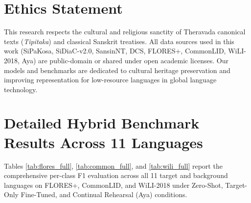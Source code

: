\documentclass[11pt]{article}
\begin{document}
\section*{Ethics Statement}
This research respects the cultural and religious sanctity of Theravada canonical texts (\textit{Tipitaka}) and classical Sanskrit treatises. All data sources used in this work (SiPaKosa, SiDiaC-v2.0, SansinNT, DCS, FLORES+, CommonLID, WiLI-2018, Aya) are public-domain or shared under open academic licenses. Our models and benchmarks are dedicated to cultural heritage preservation and improving representation for low-resource languages in global language technology.



\appendix

\section{Detailed Hybrid Benchmark Results Across 11 Languages}
\label{sec:appendix_tables}

Tables \ref{tab:flores_full}, \ref{tab:common_full}, and \ref{tab:wili_full} report the comprehensive per-class F1 evaluation across all 11 target and background languages on FLORES+, CommonLID, and WiLI-2018 under Zero-Shot, Target-Only Fine-Tuned, and Continual Rehearsal (Aya) conditions.
\end{document}
